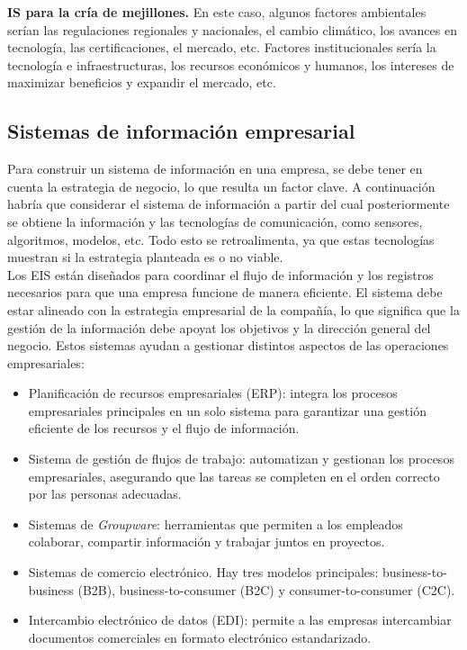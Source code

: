 \begin{example}
\textbf{IS para la cría de mejillones.} En este caso, algunos factores ambientales serían las regulaciones regionales y nacionales, el cambio climático, los avances en tecnología, las certificaciones, el mercado, etc. Factores institucionales sería la tecnología e infraestructuras, los recursos económicos y humanos, los intereses de maximizar beneficios y expandir el mercado, etc.
\end{example}

\subsection{Sistemas de información empresarial}

Para construir un sistema de información en una empresa, se debe tener en cuenta la estrategia de negocio, lo que resulta un factor clave. A continuación habría que considerar el sistema de información a partir del cual posteriormente se obtiene la información y las tecnologías de comunicación, como sensores, algoritmos, modelos, etc. Todo esto se retroalimenta, ya que estas tecnologías muestran si la estrategia planteada es o no viable. \\

Los EIS están diseñados para coordinar el flujo de información y los registros necesarios para que una empresa funcione de manera eficiente. El sistema debe estar alineado con la estrategia empresarial de la compañía, lo que significa que la gestión de la información debe apoyat los objetivos y la dirección general del negocio. Estos sistemas ayudan a gestionar distintos aspectos de las operaciones empresariales:
\begin{itemize}
\item Planificación de recursos empresariales (ERP): integra los procesos empresariales principales en un solo sistema para garantizar una gestión eficiente de los recursos y el flujo de información.
\item Sistema de gestión de flujos de trabajo: automatizan y gestionan los procesos empresariales, asegurando que las tareas se completen en el orden correcto por las personas adecuadas.
\item Sistemas de \textit{Groupware}: herramientas que permiten a los empleados colaborar, compartir información y trabajar juntos en proyectos.
\item Sistemas de comercio electrónico. Hay tres modelos principales: business-to-business (B2B), business-to-consumer (B2C) y consumer-to-consumer (C2C).
\item Intercambio electrónico de datos (EDI): permite a las empresas intercambiar documentos comerciales en formato electrónico estandarizado.
\end{itemize}

